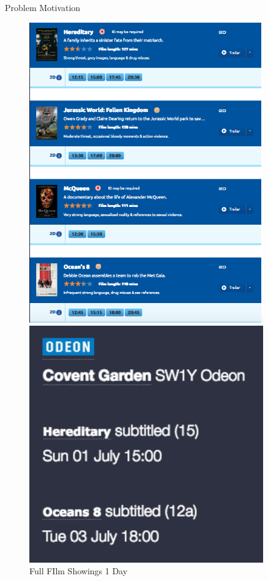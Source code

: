 \documentclass[notes]{beamer}
\begin{document}

\begin{frame}{Problem Motivation}
\begin{figure}
	\centering
	\begin{minipage}{0.45\textwidth}
		\centering
		\includegraphics[width=0.9\textwidth]{figures/ALLMOVIESLONDONFULL} %
		\caption{Full FIlm Showings 1 Day}
	\end{minipage}\hfill
	\begin{minipage}{0.45\textwidth}
		\centering
		\includegraphics[width=0.9\textwidth]{figures/SUBSMOVIESLONDON} %

\end{minipage}
\end{figure}
\end{frame}
\end{document}
